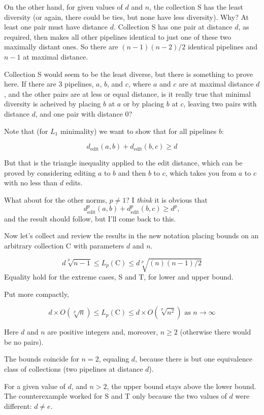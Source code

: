 \documentclass{article}
\begin{document}
On the other hand, for given values of $d$ and $n$, the collection S
has the least diversity (or again, there could be ties, but none have
less diversity).  Why?  At least one pair must have distance $d$.
Collection S has one pair at distance $d$, as required, then makes all
other pipelines identical to just one of these two maximally distant
ones.  So there are $(n-1)(n-2)/2$ identical pipelines and $n-1$ at
maximal distance.

Collection S would seem to be the least diverse, but there is
something to prove here.  If there are 3 pipelines, $a$, $b$, and $c$,
where $a$ and $c$ are at maximal distance $d$, and the other pairs are
at less or equal distance, is it really true that minimal diversity is
acheived by placing $b$ at $a$ or by placing $b$ at $c$, leaving two
pairs with distance $d$, and one pair with distance 0?

Note that (for $L_1$ minimality) we want to show that for all
pipelines $b$:

$$d_{\mbox{edit}}(a, b) + d_{\mbox{edit}}(b, c) \geq d$$

But that is the triangle inequality applied to the edit distance,
which can be proved by considering editing $a$ to $b$ and then $b$ to
$c$, which takes you from $a$ to $c$ with no less than $d$ edits.

What about for the other norms, $p \neq 1$?  I \emph{think} it is
obvious that
$$d^p_{\mbox{edit}}(a, b) + d^p_{\mbox{edit}}(b, c) \geq d^p,$$ and
the result should follow, but I'll come back to this.

Now let's collect and review the results in the new notation placing
bounds on an arbitrary collection C with parameters $d$ and $n$.

$$ d \sqrt[p]{n-1} \leq L_p(\mbox{C}) \leq d \sqrt[p]{(n)(n-1)/2} $$
Equality hold for the extreme cases, S and T, for lower and upper bound.

Put more compactly,

$$d \times O\left(\sqrt[p]{n}\right) \leq L_p(\mbox{C}) \leq d \times
O\left(\sqrt[p]{n^2}\right) \mbox{ as } n \rightarrow \infty$$

Here $d$ and $n$ are positive integers and, moreover, $n \geq 2$
(otherwise there would be no pairs).


The bounds coincide for $n=2$, equaling $d$, because
there is but one equivalence class of collections (two pipelines at
distance $d$).

For a given value of $d$, and $n > 2$, the upper bound stays above the
lower bound. The counterexample worked for S and T only
because the two values of $d$ were different: $d \neq e$.
\end{document}
